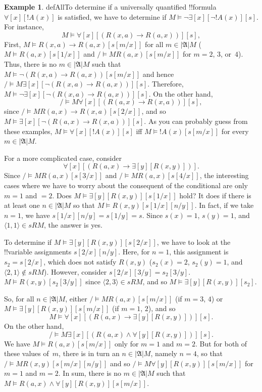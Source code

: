 \documentclass[10pt,a4paper]{article}
\theoremstyle{plain}
\theoremstyle{definition}
\newtheorem{ex}[thm]{Example}
\theoremstyle{remark}
\providecommand{\lif}{\mathbin{\rightarrow}}
\providecommand{\lforall}{\mathord{\forall}}
\providecommand{\lexists}{\mathord{\exists}}
\providecommand{\Subst}[3]{#1[#2/#3]}
\providecommand{\Domain}{\ensuremath{|\mathfrak{A}|}}
\providecommand{\Assign}{\ensuremath{s}}
\providecommand{\Sat}[2]{\ensuremath{#1 \models #2}}
\providecommand{\tuple}[1]{\langle #1 \rangle}
\providecommand{\iftag}[1]{#1}
\providecommand{\iftag}{}
\begin{document}
\begin{ex}
\iftag{defAll}{To determine if a universally quantified
  !!{formula}~$\lforall[x][!A(x)]$ is satisfied, we have to determine
  if $\Sat{M}{\lnot\lexists[x][\lnot !A(x)]}[s]$. For instance,
  \[
  \Sat{M}{\lforall[x][(R(x,a) \lif R(a,x))]}[s],
  \]
  First, $\Sat{M}{R(x,a) \lif R(a,x)}[\Subst{s}{m}{x}]$ for all $m \in
  \Domain M$ ($\Sat{M}{R(a,x)}[\Subst{s}{1}{x}]$ and
  $\Sat/{M}{R(a,x)}[\Subst{s}{m}{x}]$ for $m = 2$, $3$, or~$4$).
  Thus, there is no $m \in \Domain M$ such that
  $\Sat{M}{\lnot(R(x,a) \lif R(a,x))}[\Subst{s}{m}{x}]$ and hence
  $\Sat/{M}{\lexists[x][\lnot(R(x,a) \lif R(a,x))]}[s]$. Therefore,
  $\Sat{M}{\lnot\lexists[x][\lnot(R(x,a) \lif R(a,x))]}[s]$. On the
  other hand,
  \[
  \Sat/{M}{\lforall[x][(R(a,x) \lif R(x,a))]}[s],
  \]
  since $\Sat/{M}{R(a,x) \lif R(x,a)}[\Subst{s}{2}{x}]$, and so
  $\Sat{M}{\lexists[x][\lnot(R(a,x) \lif R(x,a))]}[s]$. As you can
  probably guess from these examples, $\Sat{M}{\lforall[x][!A(x)]}[s]$
  iff $\Sat{M}{!A(x)}[\Subst{s}{m}{x}]$ for every $m \in \Domain
  M$.}{}

For a more complicated case, consider
\[
\lforall[x][(R(a,x) \lif \lexists[y][R(x,y)])].
\]
Since $\Sat/{M}{R(a,x)}[\Subst{s}{3}{x}]$ and
$\Sat/{M}{R(a,x)}[\Subst{s}{4}{x}]$, the interesting cases where we
have to worry about the consequent of the conditional are only $m = 1$
and $ = 2$. Does $\Sat{M}{\lexists[y][R(x,y)]}[\Subst{s}{1}{x}]$
hold? It does if there is at least one $n \in \Domain M$ so that
$\Sat{M}{R(x,y)}[\Subst{\Subst{s}{1}{x}}{n}{y}]$. In fact, if we take
$n = 1$, we have $\Subst{\Subst{s}{1}{x}}{n}{y} = \Subst{s}{1}{y} =
s$. Since $s(x) = 1$, $s(y) = 1$, and $\tuple{1,1} \in \Assign{R}{M}$,
the answer is yes. 

To determine if $\Sat{M}{\lexists[y][R(x,y)]}[\Subst{s}{2}{x}]$, we
have to look at the !!{variable} assignments
$\Subst{\Subst{s}{2}{x}}{n}{y}$. Here, for $n = 1$, this assignment
is~$s_2 = \Subst{s}{2}{x}$, which does not satisfy $R(x,y)$ ($s_2(x) =
2$, $s_2(y) = 1$, and $\tuple{2,1}\notin \Assign{R}{M}$). However,
consider $\Subst{\Subst{s}{2}{x}}{3}{y} = \Subst{s_2}{3}{y}$.
$\Sat{M}{R(x,y)}[\Subst{s_2}{3}{y}]$ since $\tuple{2,3} \in
\Assign{R}{M}$, and so $\Sat{M}{\lexists[y][R(x,y)]}[s_2]$.

So, for all $n \in \Domain M$, either
$\Sat/{M}{R(a,x)}[\Subst{s}{m}{x}]$ (if $m = 3$, $4$) or
$\Sat{M}{\lexists[y][R(x,y)]}[\Subst{s}{m}{x}]$ (if $m = 1$, $2$), and so
\[
\Sat{M}{\lforall[x][(R(a,x) \lif \lexists[y][R(x,y)])]}[s].
\]
On the other hand,
\[
\Sat/{M}{\lexists[x][(R(a,x) \land \lforall[y][R(x,y)])]}[s].
\]
We have $\Sat{M}{R(a,x)}[\Subst{s}{m}{x}]$ only for $m = 1$ and $m =
2$. But for both of these values of~$m$, there is in turn an $n \in
\Domain M$, namely $n = 4$, so that
$\Sat/{M}{R(x,y)}[\Subst{\Subst{s}{m}{x}}{n}{y}]$ and so
$\Sat/{M}{\lforall[y][R(x,y)]}[\Subst{s}{m}{x}]$ for $m = 1$ and $m =
2$. In sum, there is no $m \in \Domain M$ such that $\Sat{M}{R(a,x)
\land \lforall[y][R(x,y)]}[\Subst{s}{m}{x}]$.
\end{ex}
\end{document}
